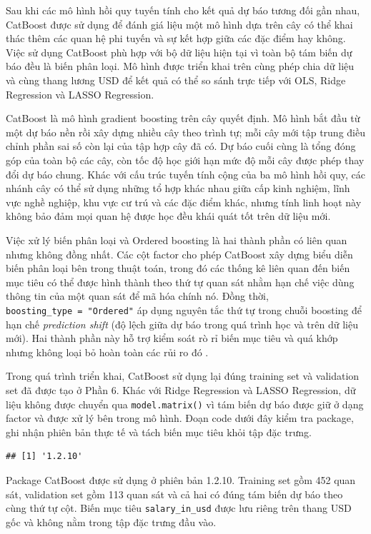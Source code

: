 Sau khi các mô hình hồi quy tuyến tính cho kết quả dự báo tương đối gần
nhau, CatBoost được sử dụng để đánh giá liệu một mô hình dựa trên cây có
thể khai thác thêm các quan hệ phi tuyến và sự kết hợp giữa các đặc điểm
hay không. Việc sử dụng CatBoost phù hợp với bộ dữ liệu hiện tại vì toàn
bộ tám biến dự báo đều là biến phân loại. Mô hình được triển khai trên
cùng phép chia dữ liệu và cùng thang lương USD để kết quả có thể so sánh
trực tiếp với OLS, Ridge Regression và LASSO Regression.

CatBoost là mô hình gradient boosting trên cây quyết định. Mô hình bắt
đầu từ một dự báo nền rồi xây dựng nhiều cây theo trình tự; mỗi cây mới
tập trung điều chỉnh phần sai số còn lại của tập hợp cây đã có. Dự báo
cuối cùng là tổng đóng góp của toàn bộ các cây, còn tốc độ học giới hạn
mức độ mỗi cây được phép thay đổi dự báo chung. Khác với cấu trúc tuyến
tính cộng của ba mô hình hồi quy, các nhánh cây có thể sử dụng những tổ
hợp khác nhau giữa cấp kinh nghiệm, lĩnh vực nghề nghiệp, khu vực cư trú
và các đặc điểm khác, nhưng tính linh hoạt này không bảo đảm mọi quan hệ
được học đều khái quát tốt trên dữ liệu mới.

Việc xử lý biến phân loại và Ordered boosting là hai thành phần có liên
quan nhưng không đồng nhất. Các cột factor cho phép CatBoost xây dựng
biểu diễn biến phân loại bên trong thuật toán, trong đó các thống kê
liên quan đến biến mục tiêu có thể được hình thành theo thứ tự quan sát
nhằm hạn chế việc dùng thông tin của một quan sát để mã hóa chính nó.
Đồng thời, \texttt{boosting\_type\ =\ "Ordered"} áp dụng nguyên tắc thứ
tự trong chuỗi boosting để hạn chế \emph{prediction shift} (độ lệch giữa
dự báo trong quá trình học và trên dữ liệu mới). Hai thành phần này hỗ
trợ kiểm soát rò rỉ biến mục tiêu và quá khớp nhưng không loại bỏ hoàn
toàn các rủi ro đó \cite{prokhorenkova2018,catboost_docs}.

Trong quá trình triển khai, CatBoost sử dụng lại đúng training set và
validation set đã được tạo ở Phần 6. Khác với Ridge Regression và LASSO
Regression, dữ liệu không được chuyển qua \texttt{model.matrix()} vì tám
biến dự báo được giữ ở dạng factor và được xử lý bên trong mô hình. Đoạn
code dưới đây kiểm tra package, ghi nhận phiên bản thực tế và tách biến
mục tiêu khỏi tập đặc trưng.

\begin{verbatim}
## [1] '1.2.10'
\end{verbatim}

Package CatBoost được sử dụng ở phiên bản 1.2.10. Training set gồm 452
quan sát, validation set gồm 113 quan sát và cả hai có đúng tám biến dự
báo theo cùng thứ tự cột. Biến mục tiêu \texttt{salary\_in\_usd} được
lưu riêng trên thang USD gốc và không nằm trong tập đặc trưng đầu vào.


